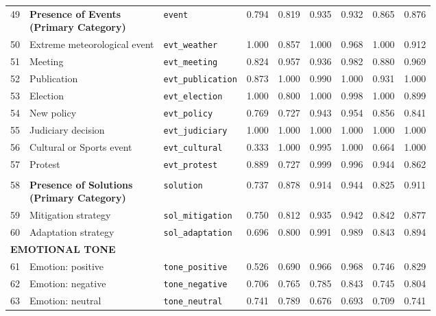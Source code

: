 \begin{longtable}{p{0.4cm}p{4.0cm}p{3.0cm}rrrrrr}
\midrule
\rowcolor{gray!8}
\multicolumn{9}{l}{\textit{Events}} \\
\midrule
49 & \textbf{Presence of Events\newline (Primary Category)} & \texttt{event} & 0.794 & 0.819 & 0.935 & 0.932 & 0.865 & 0.876 \\
\cmidrule(lr){1-9}
50 & Extreme meteorological event & \texttt{evt\_weather} & 1.000 & 0.857 & 1.000 & 0.968 & 1.000 & 0.912 \\
51 & Meeting & \texttt{evt\_meeting} & 0.824 & 0.957 & 0.936 & 0.982 & 0.880 & 0.969 \\
52 & Publication & \texttt{evt\_publication} & 0.873 & 1.000 & 0.990 & 1.000 & 0.931 & 1.000 \\
53 & Election & \texttt{evt\_election} & 1.000 & 0.800 & 1.000 & 0.998 & 1.000 & 0.899 \\
54 & New policy & \texttt{evt\_policy} & 0.769 & 0.727 & 0.943 & 0.954 & 0.856 & 0.841 \\
55 & Judiciary decision & \texttt{evt\_judiciary} & 1.000 & 1.000 & 1.000 & 1.000 & 1.000 & 1.000 \\
56 & Cultural or Sports event & \texttt{evt\_cultural} & 0.333 & 1.000 & 0.995 & 1.000 & 0.664 & 1.000 \\
57 & Protest & \texttt{evt\_protest} & 0.889 & 0.727 & 0.999 & 0.996 & 0.944 & 0.862 \\
\midrule
\rowcolor{gray!8}
\multicolumn{9}{l}{\textit{Solutions}} \\
\midrule
58 & \textbf{Presence of Solutions\newline (Primary Category)} & \texttt{solution} & 0.737 & 0.878 & 0.914 & 0.944 & 0.825 & 0.911 \\
\cmidrule(lr){1-9}
59 & Mitigation strategy & \texttt{sol\_mitigation} & 0.750 & 0.812 & 0.935 & 0.942 & 0.842 & 0.877 \\
60 & Adaptation strategy & \texttt{sol\_adaptation} & 0.696 & 0.800 & 0.991 & 0.989 & 0.843 & 0.894 \\
\midrule
\multicolumn{9}{l}{\cellcolor{gray!10}\textbf{EMOTIONAL TONE}} \\
\midrule
61 & Emotion: positive & \texttt{tone\_positive} & 0.526 & 0.690 & 0.966 & 0.968 & 0.746 & 0.829 \\
62 & Emotion: negative & \texttt{tone\_negative} & 0.706 & 0.765 & 0.785 & 0.843 & 0.745 & 0.804 \\
63 & Emotion: neutral & \texttt{tone\_neutral} & 0.741 & 0.789 & 0.676 & 0.693 & 0.709 & 0.741 \\

\end{longtable}
